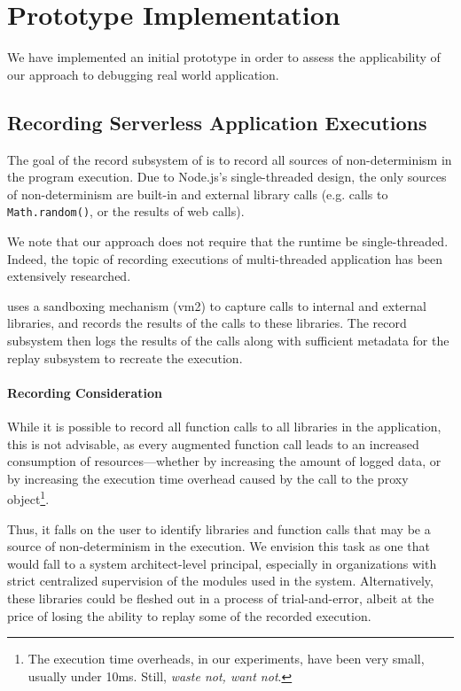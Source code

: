 \section{Prototype Implementation}
We have implemented an initial prototype in order to assess the applicability
of our approach to debugging real world application.

\subsection{Recording Serverless Application Executions}
The goal of the record subsystem of \system is to record all sources of
non-determinism in the program execution. Due to Node.js's single-threaded
design, the only sources of non-determinism are built-in and external library
calls (e.g. calls to \verb|Math.random()|, or the results of web calls).

We note that our approach does not require that the runtime be single-threaded.
Indeed, the topic of recording executions of multi-threaded application has
been extensively researched.

\system uses a sandboxing mechanism (vm2) to capture calls to internal and
external libraries, and records the results of the calls to these libraries.
The record subsystem then logs the results of the calls along with sufficient metadata for the replay subsystem to recreate the execution.

\paragraph{Recording Consideration}
While it is possible to record all function calls to all libraries in the application, this is not advisable, as every augmented function call leads to an increased consumption of resources---whether by increasing the amount of logged data, or by increasing the execution time overhead caused by the call to the proxy object\footnote{The execution time overheads, in our experiments, have been very small, usually under 10ms. Still, \emph{waste not, want not}.}.

Thus, it falls on the user to identify libraries and function calls that may be
a source of non-determinism in the execution. We envision this task as one that
would fall to a system architect-level principal, especially in organizations
with strict centralized supervision of the modules used in the system.
Alternatively, these libraries could be fleshed out  in a
process of trial-and-error, albeit at the price of losing the ability to replay
some of the recorded execution.

